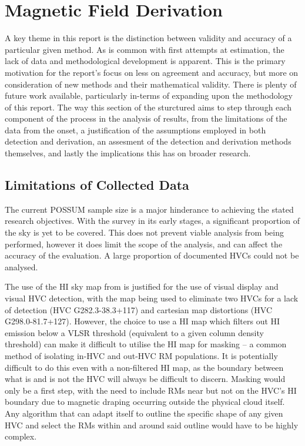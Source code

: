 \section{Magnetic Field Derivation}
\label{sec:mag_disc}

A key theme in this report is the distinction between validity and accuracy of a particular given method. As is common with first attempts at estimation, the lack of data and methodological development is apparent. This is the primary motivation for the report's focus on less on agreement and accuracy, but more on consideration of new methods and their mathematical validity. There is plenty of future work available, particularly in-terms of expanding upon the methodology of this report. The way this section of the sturctured aims to step through each component of the process in the analysis of results, from the limitations of the data from the onset, a justification of the assumptions employed in both detection and derivation, an assesment of the detection and derivation methods themselves, and lastly the implications this has on broader research.

\subsection{Limitations of Collected Data}
\label{ssec:B1}

The current POSSUM sample size is a major hinderance to achieving the stated research objectives. With the survey in its early stages, a significant proportion of the sky is yet to be covered. This does not prevent viable analysis from being performed, however it does limit the scope of the analysis, and can affect the accuracy of the evaluation. A large proportion of documented HVCs could not be analysed.


The use of the HI sky map from \cite{ID6} is justified for the use of visual display and visual HVC detection, with the map being used to eliminate two HVCs for a lack of detection (HVC G282.3-38.3+117) and cartesian map distortions (HVC G298.0-81.7+127). However, the choice to use a HI map which filters out HI emission below a VLSR threshold (equivalent to a given column density threshold) can make it difficult to utilise the HI map for masking – a common method of isolating in-HVC and out-HVC RM populations. It is potentially difficult to do this even with a non-filtered HI map, as the boundary between what is and is not the HVC will always be difficult to discern. Masking would only be a first step, with the need to include RMs near but not on the HVC's HI boundary due to magnetic draping occurring outside the physical cloud itself. Any algorithm that can adapt itself to outline the specific shape of any given HVC and select the RMs within and around said outline would have to be highly complex.


